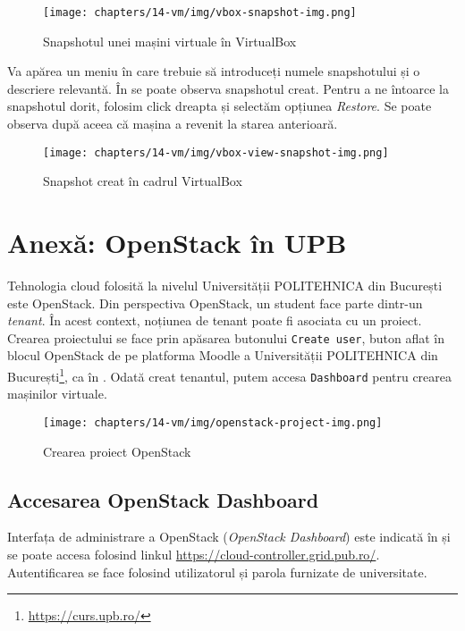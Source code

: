\begin{figure}[!htbp]
  \centering
  \texttt{[image: chapters/14-vm/img/vbox-snapshot-img.png]}
  \caption{Snapshotul unei mașini virtuale în VirtualBox}
  \label{fig:vm:vbox-snapshot}
\end{figure}

Va apărea un meniu în care trebuie să introduceți numele snapshotului și o descriere relevantă.
În  se poate observa snapshotul creat.
Pentru a ne întoarce la snapshotul dorit, folosim click dreapta și selectăm opțiunea \textit{Restore}.
 Se poate observa după aceea că mașina a revenit la starea anterioară.

\begin{figure}[!htbp]
  \centering
  \texttt{[image: chapters/14-vm/img/vbox-view-snapshot-img.png]}
  \caption{Snapshot creat în cadrul VirtualBox}
  \label{fig:vm:vbox-view-snapshot}
\end{figure}

\section{Anexă: OpenStack în UPB}
\label{sec:vm:upb-openstack}

Tehnologia cloud folosită la nivelul Universității POLITEHNICA din București este OpenStack.
 Din perspectiva OpenStack, un student face parte dintr-un \textit{tenant}.
 În acest context, noțiunea de tenant poate fi asociata cu un proiect.
Crearea proiectului se face prin apăsarea butonului \texttt{Create user}, buton aflat în blocul OpenStack de pe platforma Moodle a Universității POLITEHNICA din București\footnote{\url{https://curs.upb.ro/}}, ca în .
Odată creat tenantul, putem accesa \texttt{Dashboard} pentru crearea mașinilor virtuale.

\begin{figure}[!htbp]
  \centering
  \texttt{[image: chapters/14-vm/img/openstack-project-img.png]}
  \caption{Crearea proiect OpenStack}
  \label{fig:vm:openstack-project}
\end{figure}

\subsection{Accesarea OpenStack Dashboard}
\label{sec:vm:upb-openstack:dashboard}

Interfața de administrare a OpenStack (\textit{OpenStack Dashboard}) este indicată în  și se poate accesa folosind linkul \url{https://cloud-controller.grid.pub.ro/}.
Autentificarea se face folosind utilizatorul și parola furnizate de universitate.


